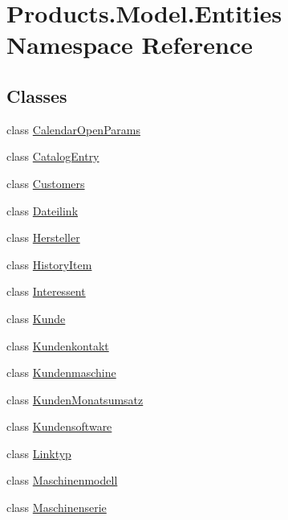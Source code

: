 \hypertarget{namespace_products_1_1_model_1_1_entities}{}\section{Products.\+Model.\+Entities Namespace Reference}
\label{namespace_products_1_1_model_1_1_entities}
\subsection*{Classes}
\begin{DoxyCompactItemize}
\item 
class \hyperlink{class_products_1_1_model_1_1_entities_1_1_calendar_open_params}{Calendar\+Open\+Params}
\item 
class \hyperlink{class_products_1_1_model_1_1_entities_1_1_catalog_entry}{Catalog\+Entry}
\item 
class \hyperlink{class_products_1_1_model_1_1_entities_1_1_customers}{Customers}
\item 
class \hyperlink{class_products_1_1_model_1_1_entities_1_1_dateilink}{Dateilink}
\item 
class \hyperlink{class_products_1_1_model_1_1_entities_1_1_hersteller}{Hersteller}
\item 
class \hyperlink{class_products_1_1_model_1_1_entities_1_1_history_item}{History\+Item}
\item 
class \hyperlink{class_products_1_1_model_1_1_entities_1_1_interessent}{Interessent}
\item 
class \hyperlink{class_products_1_1_model_1_1_entities_1_1_kunde}{Kunde}
\item 
class \hyperlink{class_products_1_1_model_1_1_entities_1_1_kundenkontakt}{Kundenkontakt}
\item 
class \hyperlink{class_products_1_1_model_1_1_entities_1_1_kundenmaschine}{Kundenmaschine}
\item 
class \hyperlink{class_products_1_1_model_1_1_entities_1_1_kunden_monatsumsatz}{Kunden\+Monatsumsatz}
\item 
class \hyperlink{class_products_1_1_model_1_1_entities_1_1_kundensoftware}{Kundensoftware}
\item 
class \hyperlink{class_products_1_1_model_1_1_entities_1_1_linktyp}{Linktyp}
\item 
class \hyperlink{class_products_1_1_model_1_1_entities_1_1_maschinenmodell}{Maschinenmodell}
\item 
class \hyperlink{class_products_1_1_model_1_1_entities_1_1_maschinenserie}{Maschinenserie}

\end{DoxyCompactItemize}
